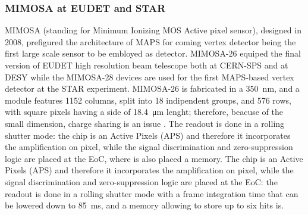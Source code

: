         \subsubsection{MIMOSA at EUDET and STAR}
        MIMOSA \cite{MIMOSA}\cite{MIMOSA26} (standing for Minimum Ionizing MOS Active pixel sensor), designed in 2008, prefigured the architecture of MAPS for coming vertex detector being the first large scale sensor to be embloyed as detector. MIMOSA-26 equiped the final version of EUDET high resolution  beam telescope both at CERN-SPS and at DESY while the MIMOSA-28 devices are used for the first MAPS-based vertex detector at the STAR experiment.
        MIMOSA-26 is fabricated in a \SI{350}{nm}, and a module features 1152 columns, split into 18 indipendent groups, and 576 rows, with square pixels having a side of \SI{18.4}{\um} lenght; therefore, beacuse of the small dimension, charge sharing is an issue . 
        The readout is done in a rolling shutter mode: the chip is an Active Pixels (APS) and therefore it incorporates the amplification on pixel, while the signal discrimination and zero-suppression logic are placed at the EoC, where is also placed a memory.
        The chip is an Active Pixels (APS) and therefore it incorporates the amplification on pixel, while the signal discrimination and zero-suppression logic are placed at the EoC: the readout is done in a rolling shutter mode with a frame integration time that can be lowered down to \SI{85}{ms}, and a memory allowing to store up to six hits is. 

